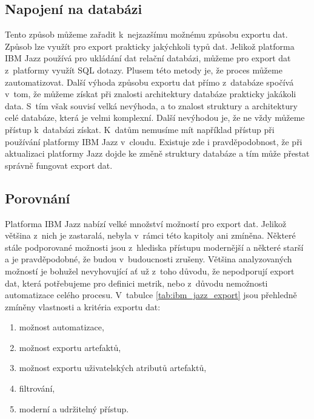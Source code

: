 \documentclass[czech,master]{diploma}
\begin{document}
\subsection{Napojení na databázi}
Tento způsob můžeme zařadit k~nejzazšímu možnému způsobu exportu dat. Způsob lze využít pro export prakticky jakýchkoli typů dat. Jelikož platforma IBM Jazz používá pro ukládání dat relační databázi, můžeme pro export dat z~platformy využít SQL dotazy. Plusem této metody je, že proces můžeme zautomatizovat. Další výhoda způsobu exportu dat přímo z~databáze spočívá v~tom, že můžeme získat při znalosti architektury databáze prakticky jakákoli data. S~tím však souvisí velká nevýhoda, a to znalost struktury a architektury celé databáze, která je velmi komplexní. Další nevýhodou je, že ne vždy můžeme přístup k~databázi získat. K~datům nemusíme mít například přístup při používání platformy IBM Jazz v~cloudu. Existuje zde i pravděpodobnost, že při aktualizaci platformy Jazz dojde ke změně struktury databáze a tím může přestat správně fungovat export dat.

\subsection{Porovnání}
Platforma IBM Jazz nabízí velké množství možností pro export dat. Jelikož většina z~nich je zastaralá, nebyla v~rámci této kapitoly ani zmíněna. Některé stále podporované možnosti jsou z~hlediska přístupu modernější a některé starší a je pravděpodobné, že budou v~budoucnosti zrušeny. Většina analyzovaných možností je bohužel nevyhovující ať už z~toho důvodu, že nepodporují export dat, která potřebujeme pro definici metrik, nebo z~důvodu nemožnosti automatizace celého procesu. V~tabulce \ref{tab:ibm_jazz_export} jsou přehledně zmíněny vlastnosti a kritéria exportu dat:

\begin{enumerate}
\item možnost automatizace,
\item možnost exportu artefaktů,
\item možnost exportu uživatelských atributů artefaktů,
\item filtrování,
\item moderní a udržitelný přístup.
\end{enumerate}
\end{document}
